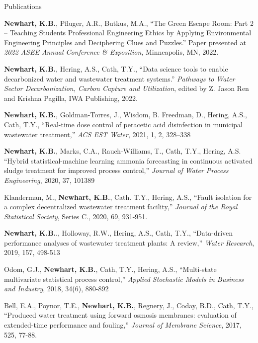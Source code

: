 \documentclass{resume} %
\begin{document}
\begin{rSection}{Publications}
\begin{etaremune}
	\item\textbf{Newhart, K.B.}, Pfluger, A.R., Butkus, M.A., ``The Green Escape Room: Part 2 – Teaching Students Professional Engineering Ethics by Applying Environmental Engineering Principles and Deciphering Clues and Puzzles.'' Paper presented at \emph{2022 ASEE Annual Conference \& Exposition}, Minneapolis, MN, 2022.

	\item \textbf{Newhart, K.B.}, Hering, A.S., Cath, T.Y., ``Data science tools to enable decarbonized water and wastewater treatment systems.'' \emph{Pathways to Water Sector Decarbonization, Carbon Capture and Utilization}, edited by Z. Jason Ren and Krishna Pagilla, IWA Publishing, 2022.

	\item \textbf{Newhart, K.B.}, Goldman-Torres, J., Wisdom, B. Freedman, D., Hering, A.S., Cath, T.Y., ``Real-time dose control of peracetic acid disinfection in municipal wastewater treatment,'' \emph{ACS EST Water}, 2021, 1, 2, 328–338

	\item \textbf{Newhart, K.B.}, Marks, C.A., Rauch-Williams, T., Cath, T.Y., Hering, A.S. ``Hybrid statistical-machine learning ammonia forecasting in continuous activated sludge treatment for improved process control,'' \emph{Journal of Water Process Engineering}, 2020, 37, 101389

	\item Klanderman, M., \textbf{Newhart, K.B.}, Cath. T.Y., Hering, A.S., ``Fault isolation for a complex decentralized wastewater treatment facility,'' \emph{Journal of the Royal Statistical Society}, Series C., 2020, 69, 931-951.

	\item \textbf{Newhart, K.B.}., Holloway, R.W., Hering, A.S., Cath, T.Y., ``Data-driven performance analyses of wastewater treatment plants: A review,'' \emph{Water Research}, 2019, 157, 498-513

	\item Odom, G.J., \textbf{Newhart, K.B.}, Cath, T.Y., Hering, A.S., ``Multi-state multivariate statistical process control,'' \emph{Applied Stochastic Models in Business and Industry}, 2018, 34(6), 880-892

	\item Bell, E.A., Poynor, T.E., \textbf{Newhart, K.B.}, Regnery, J., Coday, B.D., Cath, T.Y., ``Produced water treatment using forward osmosis membranes: evaluation of extended-time performance and fouling,'' \emph{Journal of Membrane Science}, 2017, 525, 77-88.
\end{etaremune}

\end{rSection}
\end{document}
